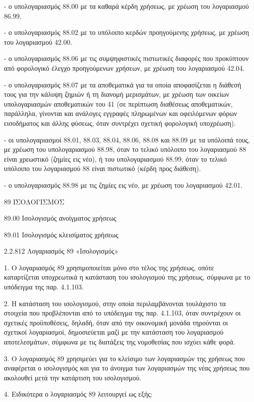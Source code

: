 \documentclass[A4,10pt,greek]{book}
\begin{document}
- ο υπολογαριασμός 88.00 με τα καθαρά κέρδη χρήσεως, με χρέωση του λογαριασμού 86.99.

- ο υπολογαριασμός 88.02 με το υπόλοιπο κερδών προηγούμενης χρήσεως, με χρέωση του λογαριασμού 42.00.

- ο υπολογαριασμός 88.06 με τις συμψηφιστικές πιστωτικές διαφορές που προκύπτουν από φορολογικό έλεγχο προηγούμενων χρήσεων, με χρέωση του λογαριασμού 42.04.

- ο υπολογαριασμός 88.07 με τα αποθεματικά για τα οποία αποφασίζεται η διάθεσή τους για την κάλυψη ζημιών ή τη διανομή μερισμάτων, με χρέωση των οικείων υπολογαριασμών αποθεματικών του 41 (σε περίπτωση διαθέσεως αποθεματικών, παράλληλα, γίνονται και ανάλογες εγγραφές πληρωμένων και οφειλόμενων φόρων εισοδήματος και άλλης φύσεως, όταν συντρέχει σχετική φορολογική υποχρέωση).

- οι υπολογαριασμοί 88.01, 88.03, 88.04, 88.06, 88.08 και 88.09 με τα υπόλοιπά τους, με χρέωση του υπολογαριασμού 88.98, όταν το τελικό υπόλοιπο του λογαριασμού 88 είναι χρεωστικό (ζημίες εις νέο), ή του υπολογαριασμού 88.99, όταν το τελικό υπόλοιπο του λογαριασμού 88 είναι πιστωτικό (κέρδη προς διάθεση).

- ο υπολογαριασμός 88.98 με τις ζημίες εις νέο, με χρέωση του λογαριασμού 42.01.

89    ΙΣΟΛΟΓΙΣΜΟΣ

        89.00    Ισολογισμός ανοίγματος χρήσεως

        89.01    Ισολογισμός κλεισίματος χρήσεως

2.2.812 Λογαριασμός 89 «Ισολογισμός»

1. Ο λογαριασμός 89 χρησιμοποιείται μόνο στο τέλος της χρήσεως, οπότε καταρτίζεται υποχρεωτικά η κατάσταση του ισολογισμού της χρήσεως, σύμφωνα με το υπόδειγμα της παρ. 4.1.103.

2. Η κατάσταση του ισολογισμού, στην οποία περιλαμβάνονται τουλάχιστο τα στοιχεία που προβλέπονται από το υπόδειγμα της παρ. 4.1.103, όταν συντρέχουν οι σχετικές προϋποθέσεις, δηλαδή, όταν από την οικονομική μονάδα τηρούνται οι σχετικοί λογαριασμοί, δημοσιεύεται μαζί με την κατάσταση του λογαριασμού αποτελεσμάτων, σύμφωνα με τις διατάξεις της νομοθεσίας που ισχύει κάθε φορά.

3. Ο λογαριασμός 89 χρησιμεύει για το κλείσιμο των λογαριασμών της χρήσεως που αναφέρεται ο ισολογισμός και για το άνοιγμα των λογαριασμών της νέας χρήσεως που ακολουθεί μετά την κατάρτιση του ισολογισμού.

4. Ειδικότερα ο λογαριασμός 89 λειτουργεί ως εξής:
\end{document}
